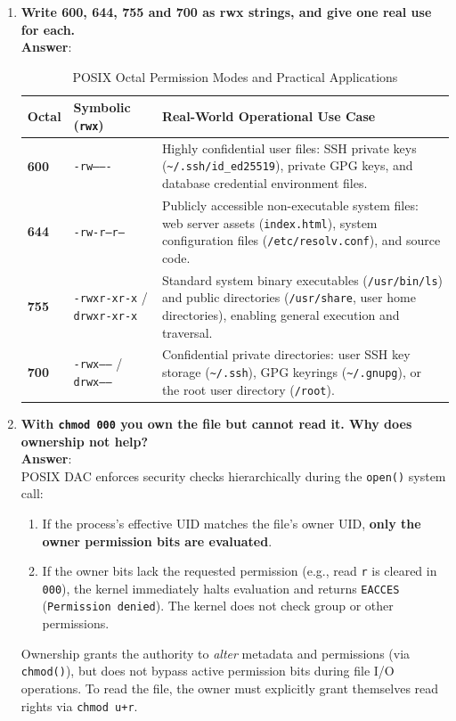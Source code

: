 \documentclass[12pt,a4paper]{article}
\begin{document}
\begin{enumerate}
    \item \textbf{Write 600, 644, 755 and 700 as rwx strings, and give one real use for each.} \\
    \textbf{Answer}:
    \begin{table}[H]
        \centering
        \caption{POSIX Octal Permission Modes and Practical Applications}
        \label{tab:permissions}
        \begin{tabularx}{\textwidth}{l l X}
            \toprule
            \textbf{Octal} & \textbf{Symbolic (\texttt{rwx})} & \textbf{Real-World Operational Use Case} \\
            \midrule
            \textbf{600} & \texttt{-rw-------} & Highly confidential user files: SSH private keys (\texttt{\textasciitilde/.ssh/id\_ed25519}), private GPG keys, and database credential environment files. \\
            \addlinespace
            \textbf{644} & \texttt{-rw-r--r--} & Publicly accessible non-executable system files: web server assets (\texttt{index.html}), system configuration files (\texttt{/etc/resolv.conf}), and source code. \\
            \addlinespace
            \textbf{755} & \texttt{-rwxr-xr-x} / \texttt{drwxr-xr-x} & Standard system binary executables (\texttt{/usr/bin/ls}) and public directories (\texttt{/usr/share}, user home directories), enabling general execution and traversal. \\
            \addlinespace
            \textbf{700} & \texttt{-rwx------} / \texttt{drwx------} & Confidential private directories: user SSH key storage (\texttt{\textasciitilde/.ssh}), GPG keyrings (\texttt{\textasciitilde/.gnupg}), or the root user directory (\texttt{/root}). \\
            \bottomrule
        \end{tabularx}
    \end{table}

    \item \textbf{With \texttt{chmod 000} you own the file but cannot read it. Why does ownership not help?} \\
    \textbf{Answer}: \\
    POSIX DAC enforces security checks hierarchically during the \texttt{open()} system call:
    \begin{enumerate}
        \item If the process's effective UID matches the file's owner UID, \textbf{only the owner permission bits are evaluated}.
        \item If the owner bits lack the requested permission (e.g., read \texttt{r} is cleared in \texttt{000}), the kernel immediately halts evaluation and returns \texttt{EACCES} (\texttt{Permission denied}). The kernel does not check group or other permissions.
    \end{enumerate}
    Ownership grants the authority to \emph{alter} metadata and permissions (via \texttt{chmod()}), but does not bypass active permission bits during file I/O operations. To read the file, the owner must explicitly grant themselves read rights via \texttt{chmod u+r}.


\end{enumerate}
\end{document}
